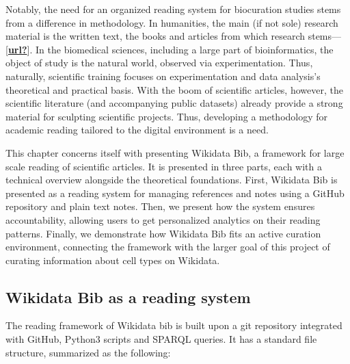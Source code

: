 Notably, the need for an organized reading system for biocuration studies stems from a difference in methodology.
In humanities, the main (if not sole) research material is the written text, the books and articles from which research stems---{[}\protect\hyperlink{ref-url}{\textbf{url?}}{]}.
In the biomedical sciences, including a large part of bioinformatics, the object of study is the natural world, observed via experimentation.
Thus, naturally, scientific training focuses on experimentation and data analysis's theoretical and practical basis.
With the boom of scientific articles, however, the scientific literature (and accompanying public datasets) already provide a strong material for sculpting scientific projects.
Thus, developing a methodology for academic reading tailored to the digital environment is a need.

This chapter concerns itself with presenting Wikidata Bib, a framework for large scale reading of scientific articles.
It is presented in three parts, each with a technical overview alongside the theoretical foundations.
First, Wikidata Bib is presented as a reading system for managing references and notes using a GitHub repository and plain text notes.
Then, we present how the system ensures accountability, allowing users to get personalized analytics on their reading patterns.
Finally, we demonstrate how Wikidata Bib fits an active curation environment, connecting the framework with the larger goal of this project of curating information about cell types on Wikidata.

\hypertarget{wikidata-bib-as-a-reading-system}{%
\subsection{Wikidata Bib as a reading system}\label{wikidata-bib-as-a-reading-system}}

The reading framework of Wikidata bib is built upon a git repository integrated with GitHub, Python3 scripts and SPARQL queries.
It has a standard file structure, summarized as the following:

